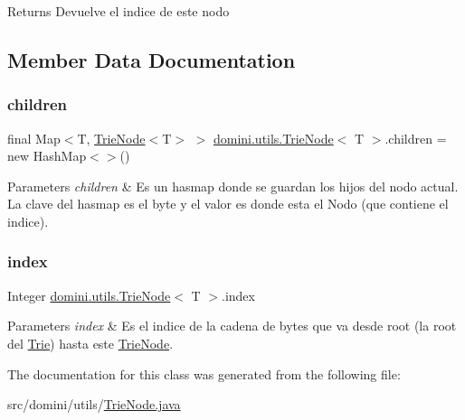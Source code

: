 \begin{DoxyReturn}{Returns}
Devuelve el indice de este nodo 
\end{DoxyReturn}


\subsection{Member Data Documentation}
\mbox{\label{classdomini_1_1utils_1_1TrieNode_ae64d9c12696f526eecb3ff15aa290640}} 
\subsubsection{\texorpdfstring{children}{children}}
{\footnotesize\ttfamily final Map$<$T, \hyperlink{classdomini_1_1utils_1_1TrieNode}{Trie\+Node}$<$T$>$ $>$ \hyperlink{classdomini_1_1utils_1_1TrieNode}{domini.\+utils.\+Trie\+Node}$<$ T $>$.children = new Hash\+Map$<$$>$()\hspace{0.3cm}{\ttfamily [private]}}


\begin{DoxyParams}{Parameters}
{\em children} & Es un hasmap donde se guardan los hijos del nodo actual. La clave del hasmap es el byte y el valor es donde esta el Nodo (que contiene el indice). \\
\hline
\end{DoxyParams}
\mbox{\label{classdomini_1_1utils_1_1TrieNode_a9c247bc6568131e5e6ad0758adb67bfa}} 
\subsubsection{\texorpdfstring{index}{index}}
{\footnotesize\ttfamily Integer \hyperlink{classdomini_1_1utils_1_1TrieNode}{domini.\+utils.\+Trie\+Node}$<$ T $>$.index\hspace{0.3cm}{\ttfamily [private]}}


\begin{DoxyParams}{Parameters}
{\em index} & Es el indice de la cadena de bytes que va desde root (la root del \hyperlink{classdomini_1_1utils_1_1Trie}{Trie}) hasta este \hyperlink{classdomini_1_1utils_1_1TrieNode}{Trie\+Node}. \\
\hline
\end{DoxyParams}


The documentation for this class was generated from the following file\+:\begin{DoxyCompactItemize}
\item 
src/domini/utils/\hyperlink{TrieNode_8java}{Trie\+Node.\+java}\end{DoxyCompactItemize}
